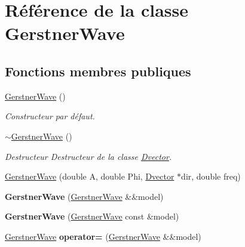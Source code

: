 \hypertarget{class_gerstner_wave}{}\section{Référence de la classe Gerstner\+Wave}
\label{class_gerstner_wave}
\subsection*{Fonctions membres publiques}
\begin{DoxyCompactItemize}
\item 
\mbox{\label{class_gerstner_wave_a207ffe78993b42001d763a0e39b99f07}} 
\hyperlink{class_gerstner_wave_a207ffe78993b42001d763a0e39b99f07}{Gerstner\+Wave} ()
\begin{DoxyCompactList}\small\item\em Constructeur par défaut. \end{DoxyCompactList}\item 
\mbox{\label{class_gerstner_wave_af3df02ad2ba5fa164c83e332eabadfea}} 
\hyperlink{class_gerstner_wave_af3df02ad2ba5fa164c83e332eabadfea}{$\sim$\+Gerstner\+Wave} ()
\begin{DoxyCompactList}\small\item\em Destructeur Destructeur de la classe \hyperlink{class_dvector}{Dvector}. \end{DoxyCompactList}\item 
\hyperlink{class_gerstner_wave_aca3a91ab8ae49e3814bfd5b6e4607f31}{Gerstner\+Wave} (double A, double Phi, \hyperlink{class_dvector}{Dvector} $\ast$dir, double freq)
\item 
\mbox{\label{class_gerstner_wave_a5e019cb6bf88fae82be53dcbfb2c5109}} 
{\bfseries Gerstner\+Wave} (\hyperlink{class_gerstner_wave}{Gerstner\+Wave} \&\&model)
\item 
\mbox{\label{class_gerstner_wave_aba4dcf8262af3cbc677804c63f9104d4}} 
{\bfseries Gerstner\+Wave} (\hyperlink{class_gerstner_wave}{Gerstner\+Wave} const \&model)
\item 
\mbox{\label{class_gerstner_wave_aa2773b91856128983df03e8983970e86}} 
\hyperlink{class_gerstner_wave}{Gerstner\+Wave} {\bfseries operator=} (\hyperlink{class_gerstner_wave}{Gerstner\+Wave} \&\&model)

\end{DoxyCompactItemize}
